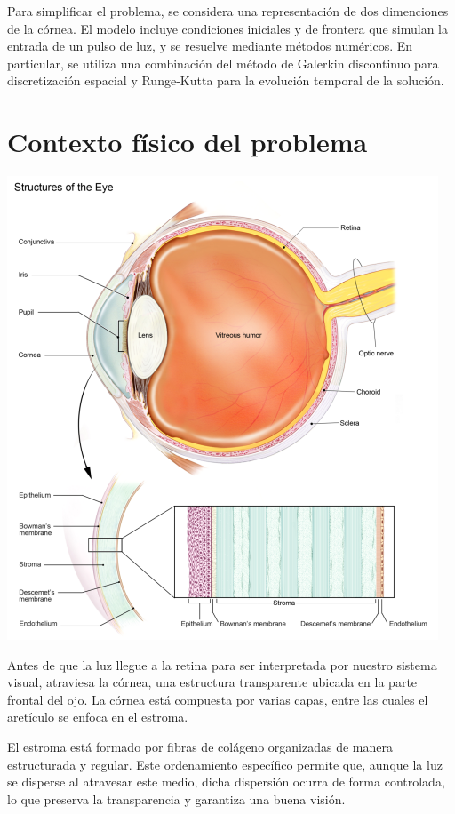 \documentclass[10pt,a4paper]{article}
\begin{document}
Para simplificar el problema, se considera una representación de dos dimenciones de la córnea. El modelo incluye condiciones iniciales y de frontera que simulan la entrada de un pulso de luz, y se resuelve mediante métodos numéricos. En particular, se utiliza una combinación del método de Galerkin discontinuo para discretización espacial y Runge-Kutta para la evolución temporal de la solución.

\section{Contexto físico del problema}

\begin{center}
	\includegraphics[scale=0.5]{partes-ojo.png} 
\end{center}

Antes de que la luz llegue a la retina para ser interpretada por nuestro sistema visual, atraviesa la córnea, una estructura transparente ubicada en la parte frontal del ojo. La córnea está compuesta por varias capas, entre las cuales el aretículo se enfoca en el estroma.

El estroma está formado por fibras de colágeno organizadas de manera estructurada y regular. Este ordenamiento específico permite que, aunque la luz se disperse al atravesar este medio, dicha dispersión ocurra de forma controlada, lo que preserva la transparencia y garantiza una buena visión.
\end{document}
